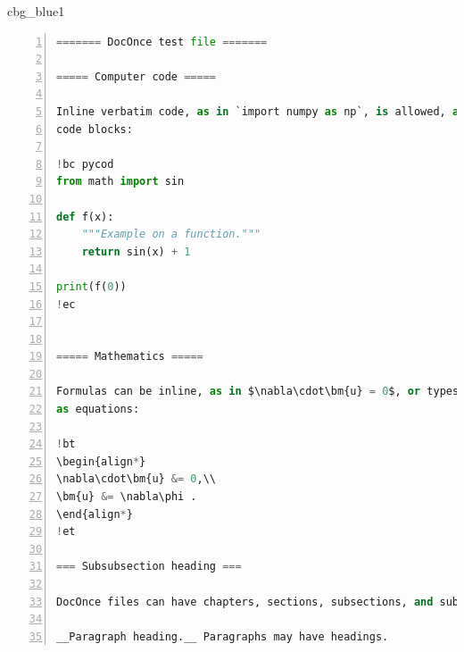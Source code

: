 \n\documentclass[%
oneside,                 %
final,                   %
10pt]{article}
\newenvironment{_cod_tight}[1]{
   \def\FrameCommand{\colorbox{#1}}
   \FrameRule0.6pt\MakeFramed {\FrameRestore}\vskip3mm}
   {\vskip0mm\endMakeFramed}
\newenvironment{cod}[1]{
\bgroup\rmfamily
\fboxsep=0mm\relax
\begin{_cod_tight}{#1}
\list{}{\parsep=-2mm\parskip=0mm\topsep=0pt\leftmargin=2mm
\rightmargin=2\leftmargin\leftmargin=4pt\relax}
\item\relax}
{\endlist\end{_cod_tight}\egroup}
\theoremstyle{definition}
\begin{document}
\begin{cod}{cbg_blue1}\begin{lstlisting}[language=Python,style=myspeciallststyle,numbers=left,numberstyle=\tiny,stepnumber=3,numbersep=15pt,xleftmargin=1mm]
======= DocOnce test file =======

===== Computer code =====

Inline verbatim code, as in `import numpy as np`, is allowed, as well as
code blocks:

!bc pycod
from math import sin

def f(x):
    """Example on a function."""
    return sin(x) + 1

print(f(0))
!ec


===== Mathematics =====

Formulas can be inline, as in $\nabla\cdot\bm{u} = 0$, or typeset
as equations:

!bt
\begin{align*}
\nabla\cdot\bm{u} &= 0,\\ 
\bm{u} &= \nabla\phi .
\end{align*}
!et

=== Subsubsection heading ===

DocOnce files can have chapters, sections, subsections, and subsubsections.

__Paragraph heading.__ Paragraphs may have headings.

\end{lstlisting}\end{cod}
\noindent
\end{document}
